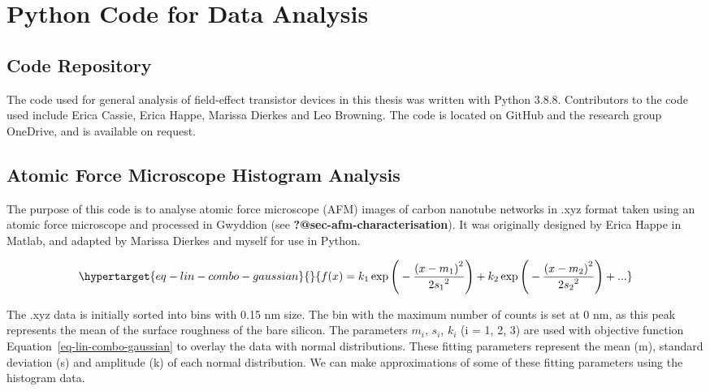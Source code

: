 \documentclass[
  a4paper,
]{scrbook}
\begin{document}
\cleardoublepage
{}
{}
\appendix

\hypertarget{sec-python}{%
\chapter{Python Code for Data Analysis}\label{sec-python}}

\hypertarget{code-repository}{%
\section{Code Repository}\label{code-repository}}

The code used for general analysis of field-effect transistor devices in
this thesis was written with Python 3.8.8. Contributors to the code used
include Erica Cassie, Erica Happe, Marissa Dierkes and Leo Browning. The
code is located on GitHub and the research group OneDrive, and is
available on request.

\hypertarget{sec-histogram-analysis}{%
\section{Atomic Force Microscope Histogram
Analysis}\label{sec-histogram-analysis}}

The purpose of this code is to analyse atomic force microscope (AFM)
images of carbon nanotube networks in .xyz format taken using an atomic
force microscope and processed in Gwyddion (see
\textbf{?@sec-afm-characterisation}). It was originally designed by
Erica Happe in Matlab, and adapted by Marissa Dierkes and myself for use
in Python.

\begin{equation}\protect\hypertarget{eq-lin-combo-gaussian}{}{
f(x) = k_1\exp{\Bigg(-\frac{{(x-m_1)}^{2}}{{2s_1}^{2}}\Bigg)} + k_2\exp{\Bigg(-\frac{{(x-m_2)}^{2}}{{2s_2}^{2}}\Bigg)} + ...
}\label{eq-lin-combo-gaussian}\end{equation}

The .xyz data is initially sorted into bins with 0.15 nm size. The bin
with the maximum number of counts is set at 0 nm, as this peak
represents the mean of the surface roughness of the bare silicon. The
parameters \(m_i\), \(s_i\), \(k_i\) (i = 1, 2, 3) are used with
objective function Equation~\ref{eq-lin-combo-gaussian} to overlay the
data with normal distributions. These fitting parameters represent the
mean (m), standard deviation (s) and amplitude (k) of each normal
distribution. We can make approximations of some of these fitting
parameters using the histogram data.
\end{document}
